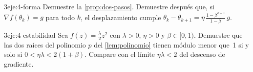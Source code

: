 \begin{ejercicio}{3}{eje:4-forma}
Demuestre la \cref{prop:dos-pasos}. Demuestre después que, si $\nabla f(\theta_k)=g$ para todo $k$, el desplazamiento cumple $\theta_k-\theta_{k+1}=\eta\,\frac{1-\beta^{k+1}}{1-\beta}\,g$.
\end{ejercicio}

\begin{ejercicio}{3}{eje:4-estabilidad}
Sea $f(z)=\frac{\lambda}{2}z^{2}$ con $\lambda>0$, $\eta>0$ y $\beta\in[0,1)$. Demuestre que las dos raíces del polinomio $p$ del \cref{lem:polinomio} tienen módulo menor que~1 si y solo si $0<\eta\lambda<2(1+\beta)$. Compare con el límite $\eta\lambda<2$ del descenso de gradiente.
\end{ejercicio}
